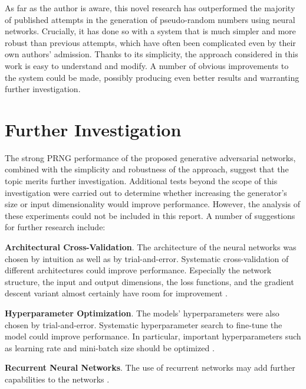 \documentclass[12pt, titlepage]{report}
\theoremstyle{definition}
\begin{document}
As far as the author is aware, this novel research has outperformed the majority of published attempts in the generation of pseudo-random numbers using neural networks. Crucially, it has done so with a system that is much simpler and more robust than previous attempts, which have often been complicated even by their own authors' admission. Thanks to its simplicity, the approach considered in this work is easy to understand and modify. A number of obvious improvements to the system could be made, possibly producing even better results and warranting further investigation.




\chapter{Further Investigation}
The strong PRNG performance of the proposed generative adversarial networks, combined with the simplicity and robustness of the approach, suggest that the topic merits further investigation.
Additional tests beyond the scope of this investigation were carried out to determine whether increasing the generator's size or input dimensionality would improve performance. However, the analysis of these experiments could not be included in this report. A number of suggestions for further research include:

\textbf{Architectural Cross-Validation}. The architecture of the neural networks was chosen by intuition as well as by trial-and-error. Systematic cross-validation of different architectures could improve performance. Especially the network structure, the input and output dimensions, the loss functions, and the gradient descent variant almost certainly have room for improvement \cite[Neural Networks Part 3: Learning and Ealuation]{karpathy2017cs231n}.

\textbf{Hyperparameter Optimization}. The models' hyperparameters were also chosen by trial-and-error. Systematic hyperparameter search to fine-tune the model could improve performance. In particular, important hyperparameters such as learning rate and mini-batch size should be optimized \cite[Neural Networks Part 3: Learning and Ealuation]{karpathy2017cs231n}.

\textbf{Recurrent Neural Networks}. The use of recurrent networks may add further capabilities to the networks \cite[chap. 10]{goodfellow2016deep}.
\end{document}
